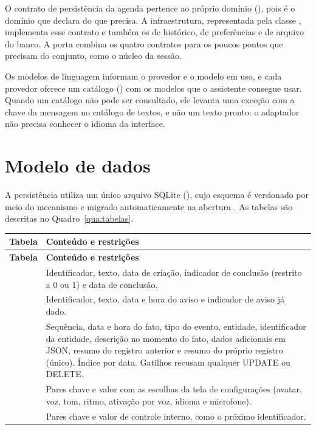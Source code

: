 O contrato de persistência da agenda pertence ao próprio domínio (),
pois é o domínio que declara do que precisa. A infraestrutura, representada pela classe
, implementa esse contrato e também os de histórico, de preferências e de arquivo
do banco. A porta  combina os quatro contratos para os poucos pontos que
precisam do conjunto, como o núcleo da sessão.

Os modelos de linguagem informam o provedor e o modelo em uso, e cada provedor oferece um catálogo
() com os modelos que o assistente consegue usar. Quando um catálogo não pode ser
consultado, ele levanta uma exceção com a chave da mensagem no catálogo de textos, e não um texto
pronto: o adaptador não precisa conhecer o idioma da interface.

\section{Modelo de dados}

A persistência utiliza um único arquivo SQLite (), cujo esquema é versionado por meio
do mecanismo  e migrado automaticamente na abertura \cite{sqlite}. As tabelas
são descritas no Quadro~\ref{qua:tabelas}.

\begin{singlespace}
\label{qua:tabelas}
\small
\begin{tabularx}{\textwidth}{|P{2.9cm}|L|}
\hline
\textbf{Tabela} & \textbf{Conteúdo e restrições} \\ \hline
\endfirsthead
\hline
\textbf{Tabela} & \textbf{Conteúdo e restrições} \\ \hline
\endhead
{} & Identificador, texto, data de criação, indicador de conclusão (restrito a 0 ou 1) e
data de conclusão. \\ \hline
{} & Identificador, texto, data e hora do aviso e indicador de aviso já dado. \\ \hline
{} & Sequência, data e hora do fato, tipo do evento, entidade, identificador da entidade,
descrição no momento do fato, dados adicionais em JSON, resumo do registro anterior e resumo do
próprio registro (único). Índice por data. Gatilhos recusam qualquer UPDATE ou DELETE. \\ \hline
{} & Pares chave e valor com as escolhas da tela de configurações (avatar, voz, tom,
ritmo, ativação por voz, idioma e microfone). \\ \hline
{} & Pares chave e valor de controle interno, como o próximo identificador. \\ \hline
\end{tabularx}
\end{singlespace}

